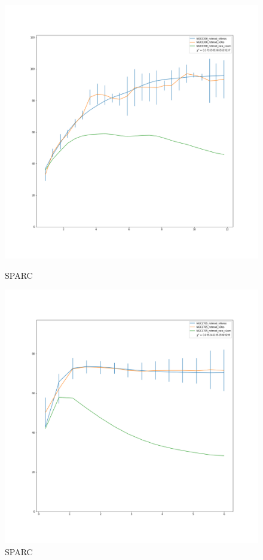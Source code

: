 \documentclass[reprint,%
 amsmath,amssymb,
 aps,
]{revtex4-1}
\begin{document}
\begin{figure} 
\centering
\begin{minipage}{0.5\textwidth}
  \includegraphics[width=.8\linewidth]{figures/NGC0300_rotmod_XueSofue.png}
\caption{ SPARC\cite{2016Lelli}}
\label{fig:0300}
\end{minipage}
\begin{minipage}{0.5\textwidth}
  \includegraphics[width=.8\linewidth]{figures/NGC1705_rotmod_XueSofue.png}
\caption{ SPARC\cite{2016Lelli}}
\label{fig:2915}
\end{minipage}
\end{figure}
\end{document}
